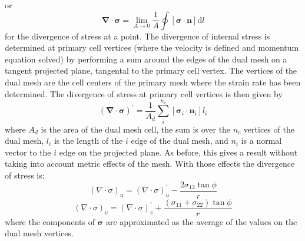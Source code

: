 or
\begin{equation}
\boldsymbol{\nabla} \cdot \boldsymbol{\sigma} = \lim_{A \to 0}  \frac{1}{A} \oint \left[ \boldsymbol{\sigma} \cdot \boldsymbol{n} \right] \mathrm{d}l
\end{equation}
for the divergence of stress at a point.
The divergence of internal stress is determined at primary cell vertices (where the velocity is defined and momentum equation solved) by performing a sum around the edges of the dual mesh on a tangent projected plane, tangental to the primary cell vertex. The vertices of the dual mesh are the cell centers of the primary mesh where the strain rate has been determined. The divergence of stress at primary cell vertices is then given by
\begin{equation}
(\boldsymbol{\nabla} \cdot \boldsymbol{\sigma})^\prime = \frac{1}{A_d} \sum_i^{n_c} \left[ \boldsymbol{\sigma}_i \cdot \boldsymbol{n}_i \right] l_i
\end{equation}
where $A_d$ is the area of the dual mesh cell, the sum is over the $n_c$ vertices of the dual mesh, $l_i$ is the length of the $i$ edge of the dual mesh, and $n_i$ is a normal vector to the $i$ edge on the projected plane. As before, this gives a result without taking into account metric effects of the mesh. With those effects the divergence of stress is:
\begin{equation}
(\nabla \cdot \sigma)_u = (\nabla \cdot \sigma)_u^\prime - \frac{2 \sigma_{12} \tan{\phi}}{r}
\end{equation}
\begin{equation}
(\nabla \cdot \sigma)_v = (\nabla \cdot \sigma)_v^\prime + \frac{(\sigma_{11} + \sigma_{22}) \tan{\phi}}{r}
\end{equation}
where the components of $\boldsymbol{\sigma}$ are approximated as the
average of the values on the dual mesh vertices.
